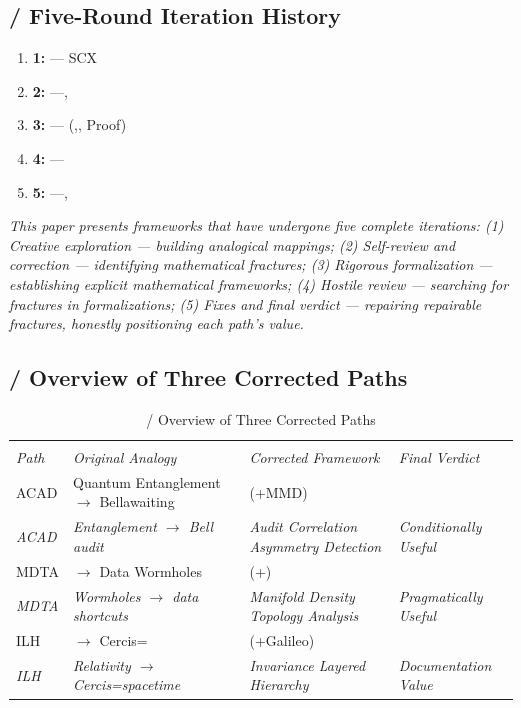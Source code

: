 \documentclass[11pt,a4paper]{article}
\theoremstyle{plain}
\theoremstyle{definition}
\theoremstyle{remark}
\begin{document}
{\subsection{ / Five-Round Iteration History}
\begin{enumerate}[leftmargin=*]
 \item \textbf{1: } --- SCX
 \item \textbf{2: } ---, 
 \item \textbf{3: } --- (,, Proof)
 \item \textbf{4: } --- 
 \item \textbf{5: } ---, 
\end{enumerate}
\textit{This paper presents frameworks that have undergone five complete iterations: (1) Creative exploration --- building analogical mappings; (2) Self-review and correction --- identifying mathematical fractures; (3) Rigorous formalization --- establishing explicit mathematical frameworks; (4) Hostile review --- searching for fractures in formalizations; (5) Fixes and final verdict --- repairing repairable fractures, honestly positioning each path's value.}
\subsection{ / Overview of Three Corrected Paths}
\begin{table}[h]
\centering
\begin{tabular}{p{2cm} p{3.5cm} p{3.5cm} p{3cm}}
\toprule
 &  &  &  \\
\textit{Path} & \textit{Original Analogy} & \textit{Corrected Framework} & \textit{Final Verdict} \\
\midrule
ACAD & Quantum Entanglement $\rightarrow$ Bellawaiting & (+MMD) &  \\
\textit{ACAD} & \textit{Entanglement $\rightarrow$ Bell audit} & \textit{Audit Correlation Asymmetry Detection} & \textit{Conditionally Useful} \\
\addlinespace
MDTA & $\rightarrow$ Data Wormholes & (+) &  \\
\textit{MDTA} & \textit{Wormholes $\rightarrow$ data shortcuts} & \textit{Manifold Density Topology Analysis} & \textit{Pragmatically Useful} \\
\addlinespace
ILH & $\rightarrow$ Cercis= & (+Galileo) &  \\
\textit{ILH} & \textit{Relativity $\rightarrow$ Cercis=spacetime} & \textit{Invariance Layered Hierarchy} & \textit{Documentation Value} \\
\bottomrule
\end{tabular}
\caption{ / Overview of Three Corrected Paths}
\label{tab:overview}
\end{table}
}
\end{document}
